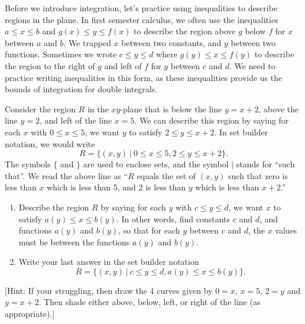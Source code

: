 \vskip0.2cm


Before we introduce integration, let's practice using inequalities to describe regions in the plane.  In first semester calculus, we often use the inequalities $a\leq x\leq b$ and $g(x)\leq y\leq f(x)$ to describe the region above $g$ below $f$ for $x$ between $a$ and $b$.  We trapped $x$ between two constants, and $y$ between two functions.  Sometimes we wrote $c\leq y\leq d$ where $g(y)\leq x\leq f(y)$ to describe the region to the right of $g$ and left of $f$ for $y$ between $c$ and $d$. We need to practice writing inequalities in this form, as these inequalities provide us the bounds of integration for double integrals.


\begin{problem}
 Consider the region $R$ in the $xy$-plane that is below the line $y=x+2$, above the line $y=2$, and left of the line $x=5$. We can describe this region by saying for each $x$ with $0\leq x\leq 5$, we want $y$ to satisfy $2\leq y\leq x+2$. In set builder notation, we would write
$$R=\{(x,y)\ | \ 0\leq x\leq 5, 2\leq y\leq x+2\}.$$
The symbols $\{$ and $\}$ are used to enclose sets, and the symbol $|$ stands for ``such that''. We read the above line as ``$R$ equals the set of $(x,y)$ such that zero is less than $x$ which is less than 5, and 2 is less than $y$ which is less than $x+2$.''
\begin{enumerate}
 \item Describe the region $R$ by saying for each $y$ with $c\leq y\leq d$, we want $x$ to satisfy $a(y)\leq x\leq b(y)$. In other words, find constants $c$ and $d$, and functions $a(y)$ and $b(y)$, so that for each $y$ between $c$ and $d$, the $x$ values must be between the functions $a(y)$ and $b(y)$.
 \item Write your last answer in the set builder notation
$$R=\{(x,y)\ | \ c\leq y\leq d, a(y)\leq x\leq b(y)\}.$$
\end{enumerate}
[Hint:  If your struggling, then draw the 4 curves given by $0=x$, $x= 5$, $2=y$ and $y= x+2$.  Then shade either above, below, left, or right of the line (as appropriate).]
\end{problem}

